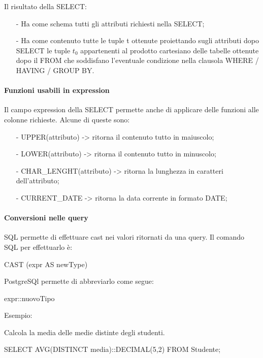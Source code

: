 \documentclass[a4paper, 10pt]{report}
\begin{document}
\noindent Il risultato della SELECT:
\begin{itemize}
\item[-] Ha come schema tutti gli attributi richiesti nella SELECT;
\item[-] Ha come contenuto tutte le tuple t ottenute proiettando sugli attributi
dopo SELECT le tuple $t_0$ appartenenti al prodotto cartesiano delle tabelle
ottenute dopo il FROM che soddisfano l’eventuale condizione nella
clausola WHERE / HAVING / GROUP BY.
\end{itemize}

\paragraph*{Funzioni usabili in expression} Il campo expression della SELECT permette anche di applicare delle funzioni alle colonne richieste. Alcune di queste sono:
\begin{itemize}
\item[-] UPPER(attributo) -> ritorna il contenuto tutto in maiuscolo;
\item[-] LOWER(attributo) -> ritorna il contenuto tutto in minuscolo;
\item[-] CHAR\_LENGHT(attributo) -> ritorna la lunghezza in caratteri dell'attributo;
\item[-] CURRENT\_DATE -> ritorna la data corrente in formato DATE;
\end{itemize}

\paragraph*{Conversioni nelle query} SQL permette di effettuare cast nei valori ritornati da una query. Il comando SQL per effettuarlo è:
\begin{code}
	CAST (expr AS newType)
\end{code}
\noindent PostgreSQl permette di abbreviarlo come segue:
\begin{code}
	expr::nuovoTipo
\end{code}

\noindent Esempio:

\noindent Calcola la media delle medie distinte degli studenti.

\begin{code}
	SELECT AVG(DISTINCT media)::DECIMAL(5,2) 
	FROM Studente;
\end{code}
\end{document}
